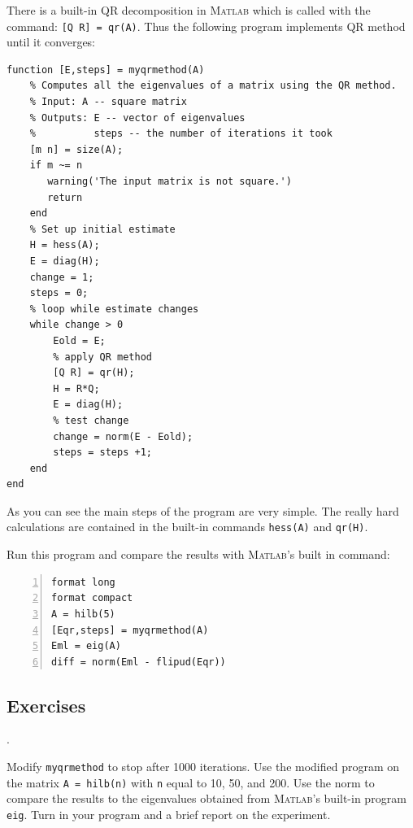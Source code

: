 There is a built-in QR decomposition in \textsc{Matlab} which
is called with the command: \verb&[Q R] = qr(A)&.
Thus the following program implements QR method until it
converges:
\newpage
\begin{lstlisting}
function [E,steps] = myqrmethod(A)
    % Computes all the eigenvalues of a matrix using the QR method.
    % Input: A -- square matrix
    % Outputs: E -- vector of eigenvalues 
    %          steps -- the number of iterations it took
    [m n] = size(A);
    if m ~= n
       warning('The input matrix is not square.')
       return
    end
    % Set up initial estimate
    H = hess(A);
    E = diag(H);
    change = 1;
    steps = 0;
    % loop while estimate changes
    while change > 0
        Eold = E;
        % apply QR method
        [Q R] = qr(H);
        H = R*Q;
        E = diag(H);
        % test change
        change = norm(E - Eold);
        steps = steps +1;
    end
end
\end{lstlisting}
As you can see the main steps of the program are very simple.
The really hard calculations are contained in the built-in commands
\verb&hess(A)& and \verb&qr(H)&.

Run this program and compare the results with \textsc{Matlab}'s built in command:
\begin{lstlisting}[frame=none,numbers=left]
format long
format compact
A = hilb(5)
[Eqr,steps] = myqrmethod(A)
Eml = eig(A)
diff = norm(Eml - flipud(Eqr))
\end{lstlisting}


\subsection*{Exercises}
\begin{list}
{.}{}

\item Modify \verb&myqrmethod& to stop after 1000
      iterations. Use the modified program
      on the matrix \verb&A = hilb(n)& with \verb&n& equal to
      10, 50, and 200. Use the norm to compare the results to
      the eigenvalues obtained from \textsc{Matlab}'s built-in program
      \verb&eig&. Turn in your program and a brief
      report on the experiment.


\end{list}





